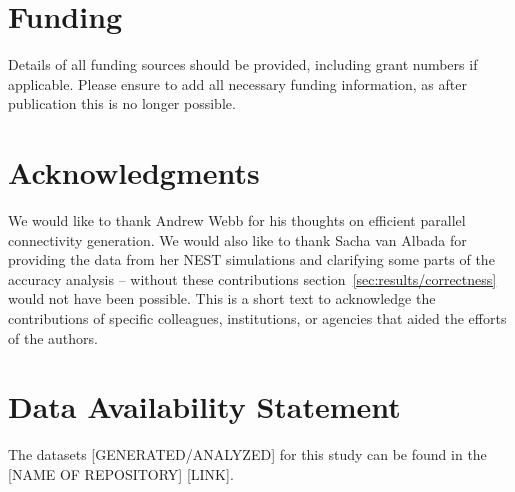\documentclass[utf8]{frontiersSCNS} %
\begin{document}
\section*{Funding}
Details of all funding sources should be provided, including grant numbers if applicable. Please ensure to add all necessary funding information, as after publication this is no longer possible.

\section*{Acknowledgments}
We would like to thank Andrew Webb for his thoughts on efficient parallel connectivity generation.
We would also like to thank Sacha van Albada for providing the data from her NEST simulations and clarifying some parts of the accuracy analysis -- without these contributions section~\ref{sec:results/correctness} would not have been possible.
This is a short text to acknowledge the contributions of specific colleagues, institutions, or agencies that aided the efforts of the authors.

\section*{Data Availability Statement}
The datasets [GENERATED/ANALYZED] for this study can be found in the [NAME OF REPOSITORY] [LINK].
%



\end{document}
